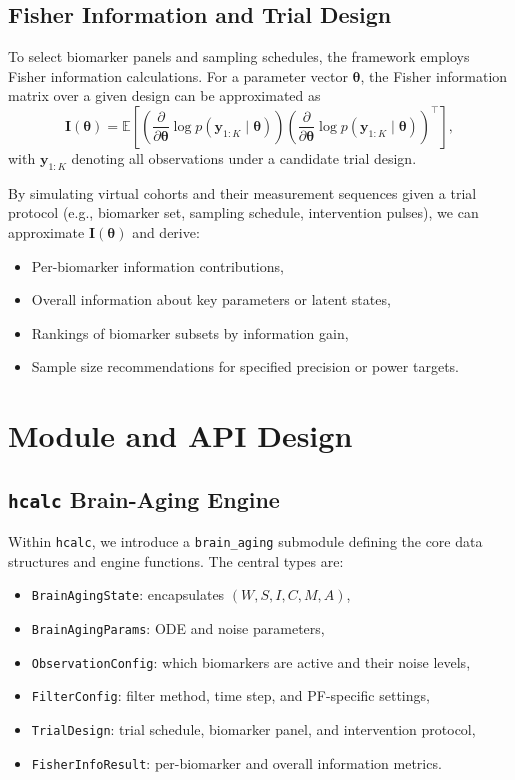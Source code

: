 \documentclass[11pt]{article}
\begin{document}
\subsection{Fisher Information and Trial Design}

To select biomarker panels and sampling schedules, the framework employs Fisher
information calculations. For a parameter vector \(\bm{\theta}\), the Fisher
information matrix over a given design can be approximated as
\[
  \bm{I}(\bm{\theta}) =
  \mathbb{E}\left[
    \left( \frac{\partial}{\partial \bm{\theta}}
      \log p(\bm{y}_{1:K} \mid \bm{\theta})
    \right)
    \left( \frac{\partial}{\partial \bm{\theta}}
      \log p(\bm{y}_{1:K} \mid \bm{\theta})
    \right)^\top
  \right],
\]
with \(\bm{y}_{1:K}\) denoting all observations under a candidate trial design.

By simulating virtual cohorts and their measurement sequences given a trial protocol
(e.g., biomarker set, sampling schedule, intervention pulses), we can approximate
\(\bm{I}(\bm{\theta})\) and derive:
\begin{itemize}[noitemsep]
  \item Per-biomarker information contributions,
  \item Overall information about key parameters or latent states,
  \item Rankings of biomarker subsets by information gain,
  \item Sample size recommendations for specified precision or power targets.
\end{itemize}

\section{Module and API Design}

\subsection{\texttt{hcalc} Brain-Aging Engine}

Within \texttt{hcalc}, we introduce a \texttt{brain\_aging} submodule defining the
core data structures and engine functions. The central types are:
\begin{itemize}[noitemsep]
  \item \texttt{BrainAgingState}: encapsulates \((W, S, I, C, M, A)\),
  \item \texttt{BrainAgingParams}: ODE and noise parameters,
  \item \texttt{ObservationConfig}: which biomarkers are active and their noise levels,
  \item \texttt{FilterConfig}: filter method, time step, and PF-specific settings,
  \item \texttt{TrialDesign}: trial schedule, biomarker panel, and intervention protocol,
  \item \texttt{FisherInfoResult}: per-biomarker and overall information metrics.
\end{itemize}
\end{document}

